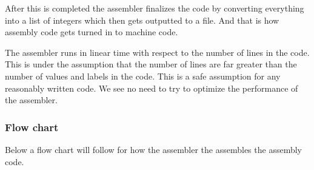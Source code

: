 \documentclass{article}
\begin{document}
After this is completed the assembler finalizes the code by converting
everything into a list of integers which then gets outputted to a file. And that
is how assembly code gets turned in to machine code.

The assembler runs in linear time with respect to the number of lines in the
code. This is under the assumption that the number of lines are far greater than
the number of values and labels in the code. This is a safe assumption for any
reasonably written code. We see no need to try to optimize the performance of the
assembler.

\subsubsection{Flow chart}
Below a flow chart will follow for how the assembler the assembles the
assembly code.
\end{document}
